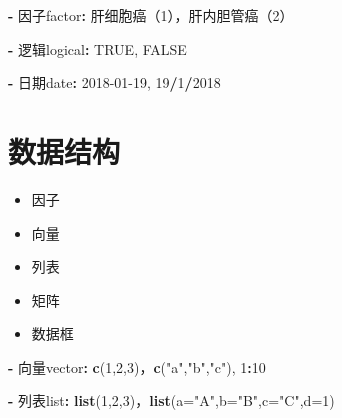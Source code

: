 \documentclass[]{book}
\newenvironment{Shaded}{\begin{snugshade}}{\end{snugshade}}
\newcommand{\DataTypeTok}[1]{\textcolor[rgb]{0.13,0.29,0.53}{#1}}
\newcommand{\DecValTok}[1]{\textcolor[rgb]{0.00,0.00,0.81}{#1}}
\newcommand{\KeywordTok}[1]{\textcolor[rgb]{0.13,0.29,0.53}{\textbf{#1}}}
\newcommand{\NormalTok}[1]{#1}
\newcommand{\OperatorTok}[1]{\textcolor[rgb]{0.81,0.36,0.00}{\textbf{#1}}}
\newcommand{\OtherTok}[1]{\textcolor[rgb]{0.56,0.35,0.01}{#1}}
\newcommand{\StringTok}[1]{\textcolor[rgb]{0.31,0.60,0.02}{#1}}
\providecommand{\tightlist}{%
  \setlength{\itemsep}{0pt}\setlength{\parskip}{0pt}}
\begin{document}
\begin{Shaded}
\begin{Highlighting}[]
\OperatorTok{-}\StringTok{ }\NormalTok{因子factor}\OperatorTok{:}\StringTok{ }\NormalTok{肝细胞癌（1），肝内胆管癌（2）}
\end{Highlighting}
\end{Shaded}

\begin{Shaded}
\begin{Highlighting}[]
\OperatorTok{-}\StringTok{ }\NormalTok{逻辑logical}\OperatorTok{:}\StringTok{ }\OtherTok{TRUE}\NormalTok{, }\OtherTok{FALSE}
\end{Highlighting}
\end{Shaded}

\begin{Shaded}
\begin{Highlighting}[]
\OperatorTok{-}\StringTok{ }\NormalTok{日期date}\OperatorTok{:}\StringTok{ }\DecValTok{2018-01-19}\NormalTok{, }\DecValTok{19}\OperatorTok{/}\DecValTok{1}\OperatorTok{/}\DecValTok{2018}
\end{Highlighting}
\end{Shaded}

\hypertarget{section-4}{%
\section{数据结构}\label{section-4}}

\begin{itemize}
\tightlist
\item
  因子
\item
  向量
\item
  列表
\item
  矩阵
\item
  数据框
\end{itemize}

\begin{Shaded}
\begin{Highlighting}[]
\OperatorTok{-}\StringTok{ }\NormalTok{向量vector}\OperatorTok{:}\StringTok{ }\KeywordTok{c}\NormalTok{(}\DecValTok{1}\NormalTok{,}\DecValTok{2}\NormalTok{,}\DecValTok{3}\NormalTok{)，}\KeywordTok{c}\NormalTok{(}\StringTok{"a"}\NormalTok{,}\StringTok{"b"}\NormalTok{,}\StringTok{"c"}\NormalTok{), }\DecValTok{1}\OperatorTok{:}\DecValTok{10}
\end{Highlighting}
\end{Shaded}

\begin{Shaded}
\begin{Highlighting}[]
\OperatorTok{-}\StringTok{ }\NormalTok{列表list}\OperatorTok{:}\StringTok{ }\KeywordTok{list}\NormalTok{(}\DecValTok{1}\NormalTok{,}\DecValTok{2}\NormalTok{,}\DecValTok{3}\NormalTok{)，}\KeywordTok{list}\NormalTok{(}\DataTypeTok{a=}\StringTok{"A"}\NormalTok{,}\DataTypeTok{b=}\StringTok{"B"}\NormalTok{,}\DataTypeTok{c=}\StringTok{"C"}\NormalTok{,}\DataTypeTok{d=}\DecValTok{1}\NormalTok{)}
\end{Highlighting}
\end{Shaded}
\end{document}
